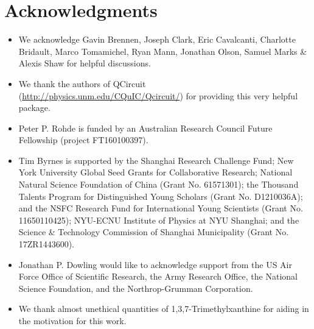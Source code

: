 %
%

\section*{Acknowledgments}

\begin{itemize}
\item We acknowledge Gavin Brennen, Joseph Clark, Eric Cavalcanti, Charlotte Bridault, Marco Tomamichel, Ryan Mann, Jonathan Olson, Samuel Marks \& Alexis Shaw for helpful discussions.
\item We thank the authors of QCircuit (\href{http://physics.unm.edu/CQuIC/Qcircuit/}{http://physics.unm.edu/CQuIC/Qcircuit/}) for providing this very helpful package.
\item Peter P. Rohde is funded by an Australian Research Council Future Fellowship (project FT160100397).
\item Tim Byrnes is supported by the Shanghai Research Challenge Fund; New York University Global Seed Grants for Collaborative Research; National Natural Science Foundation of China (Grant No. 61571301); the Thousand Talents Program for Distinguished Young Scholars (Grant No. D1210036A); and the NSFC Research Fund for International Young Scientists (Grant No. 11650110425); NYU-ECNU Institute of Physics at NYU Shanghai; and the Science \& Technology Commission of Shanghai Municipality (Grant No. 17ZR1443600).
\item Jonathan P. Dowling would like to acknowledge support from the US Air Force Office of Scientific Research, the Army Research Office, the National Science Foundation, and the Northrop-Grumman Corporation.
\item We thank almost unethical quantities of 1,3,7-Trimethylxanthine for aiding in the motivation for this work.
\end{itemize}